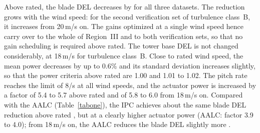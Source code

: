 Above rated, the blade DEL decreases by  for all three datasets. The reduction grows with the wind speed: for the second verification set of turbulence class~B, it increases  from 20\,m/s on. The gains optimized at a single wind speed hence carry over to the whole of Region~III and to both verification sets, so that no gain scheduling is required above rated. The tower base DEL is not changed considerably,  at 18\,m/s for turbulence class~B.  Close to rated wind speed, the mean power decreases by up to 0.6\% and its standard deviation increases slightly, so that the power criteria above rated are 1.00 and 1.01 to 1.02. The pitch rate reaches the limit of 8\textdegree/s at all wind speeds, and the actuator power is increased by a factor of 5.4 to 5.7 above rated and of 5.8 to 6.0 from 18\,m/s on. Compared with the AALC (Table~\ref{tabone}), the IPC achieves about the same blade DEL reduction above rated , but at a clearly higher actuator power (AALC: factor 3.9 to 4.0); from 18\,m/s on, the AALC reduces the blade DEL slightly more .


